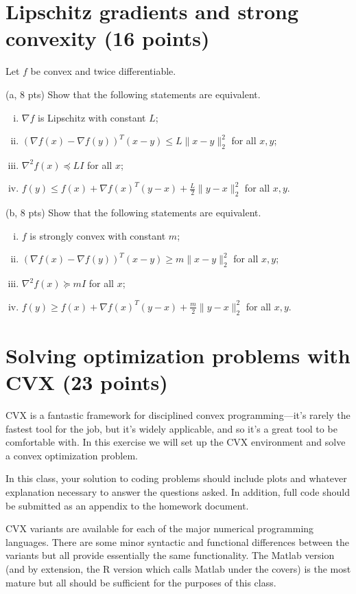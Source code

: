 \documentclass{article}
\theoremstyle{remark}
\theoremstyle{definition}
\begin{document}
\section{Lipschitz gradients
and strong convexity (16 points)}

Let $f$ be convex and twice differentiable.

\bigskip
\noindent
(a, 8 pts) Show that the following statements are equivalent.
\begin{enumerate}[i.]
\item $\nabla f$ is Lipschitz with constant $L$;
\item $(\nabla f(x) - \nabla f(y))^T(x-y) \leq L \|x-y\|_2^2$ for all
  $x,y$; 
\item $\nabla^2 f(x) \preceq LI$ for all $x$;
\item $f(y) \leq f(x) + \nabla f(x)^T (y-x) + \frac{L}{2} \|y-x\|_2^2$
  for all $x,y$.
\end{enumerate}

\bigskip
\noindent
(b, 8 pts) Show that the following statements are equivalent.
\begin{enumerate}[i.]
\item $f$ is strongly convex with constant $m$;
\item $(\nabla f(x) - \nabla f(y))^T(x-y) \geq m \|x-y\|_2^2$ for all
  $x,y$;
\item $\nabla^2 f(x) \succeq mI$ for all $x$;
\item $f(y) \geq f(x) + \nabla f(x)^T (y-x) + \frac{m}{2}
  \|y-x\|_2^2$ for all $x,y$.
\end{enumerate}

\section{Solving optimization problems with CVX (23 points)}

CVX is a fantastic framework for disciplined convex programming---it's rarely
the fastest tool for the job, but it's widely applicable, and so it's a great
tool to be comfortable with. In this exercise we will set up the CVX
environment and solve a convex optimization problem.

In this class, your
solution to coding problems should include plots and whatever explanation
necessary to answer the questions asked. In addition, full code should be
submitted as an appendix to the homework document.

CVX variants are available for each of the major numerical programming
languages. There are some minor syntactic and functional differences between the
variants but all provide essentially the same functionality. The Matlab version
(and by extension, the R version which calls Matlab under the covers) is the
most mature but all should be sufficient for the purposes of this
class.
\end{document}
